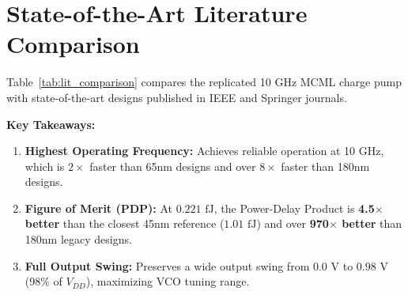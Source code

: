 \documentclass[11pt,a4paper]{report}
\begin{document}
\section{State-of-the-Art Literature Comparison}
Table~\ref{tab:lit_comparison} compares the replicated 10 GHz MCML charge pump with state-of-the-art designs published in IEEE and Springer journals.

\begin{table}[H]
    \centering
    \caption{Performance Comparison with State-of-the-Art Published Charge Pumps.}
    \label{tab:lit_comparison}
\end{table}

\textbf{Key Takeaways:}
\begin{enumerate}
    \item \textbf{Highest Operating Frequency:} Achieves reliable operation at 10 GHz, which is $2\times$ faster than 65nm designs and over $8\times$ faster than 180nm designs.
    \item \textbf{Figure of Merit (PDP):} At $0.221\text{ fJ}$, the Power-Delay Product is \textbf{4.5$\times$ better} than the closest 45nm reference ($1.01\text{ fJ}$) and over \textbf{970$\times$ better} than 180nm legacy designs.
    \item \textbf{Full Output Swing:} Preserves a wide output swing from $0.0\text{ V}$ to $0.98\text{ V}$ (98\% of $V_{DD}$), maximizing VCO tuning range.
\end{enumerate}
\end{document}
